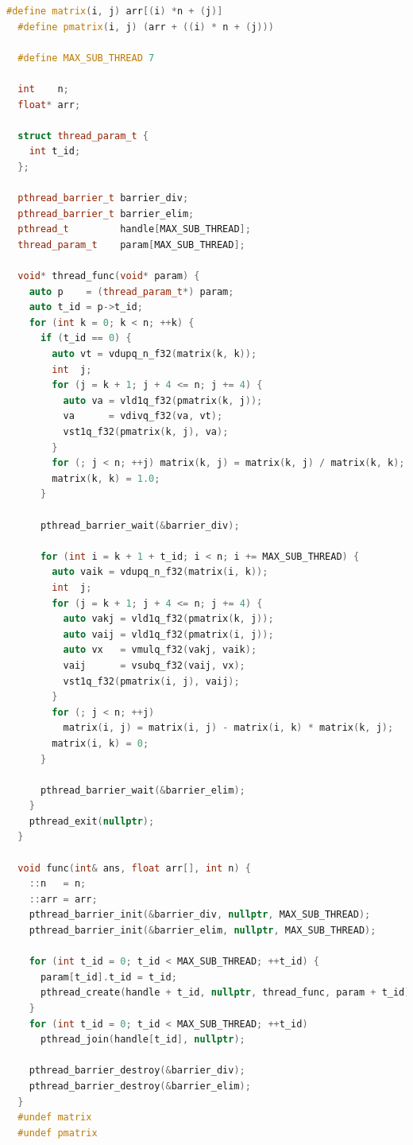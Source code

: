 \documentclass[a4paper]{article}
\begin{document}
\begin{lstlisting}[title=线程池 + 栅栏同步 + 工作线程执行除法 + NEON 指令集加速,frame=trbl,language={C++}]
  #define matrix(i, j) arr[(i) *n + (j)]
  #define pmatrix(i, j) (arr + ((i) * n + (j)))
  
  #define MAX_SUB_THREAD 7
  
  int    n;
  float* arr;
  
  struct thread_param_t {
    int t_id;
  };
  
  pthread_barrier_t barrier_div;
  pthread_barrier_t barrier_elim;
  pthread_t         handle[MAX_SUB_THREAD];
  thread_param_t    param[MAX_SUB_THREAD];
  
  void* thread_func(void* param) {
    auto p    = (thread_param_t*) param;
    auto t_id = p->t_id;
    for (int k = 0; k < n; ++k) {
      if (t_id == 0) {
        auto vt = vdupq_n_f32(matrix(k, k));
        int  j;
        for (j = k + 1; j + 4 <= n; j += 4) {
          auto va = vld1q_f32(pmatrix(k, j));
          va      = vdivq_f32(va, vt);
          vst1q_f32(pmatrix(k, j), va);
        }
        for (; j < n; ++j) matrix(k, j) = matrix(k, j) / matrix(k, k);
        matrix(k, k) = 1.0;
      }
  
      pthread_barrier_wait(&barrier_div);
  
      for (int i = k + 1 + t_id; i < n; i += MAX_SUB_THREAD) {
        auto vaik = vdupq_n_f32(matrix(i, k));
        int  j;
        for (j = k + 1; j + 4 <= n; j += 4) {
          auto vakj = vld1q_f32(pmatrix(k, j));
          auto vaij = vld1q_f32(pmatrix(i, j));
          auto vx   = vmulq_f32(vakj, vaik);
          vaij      = vsubq_f32(vaij, vx);
          vst1q_f32(pmatrix(i, j), vaij);
        }
        for (; j < n; ++j)
          matrix(i, j) = matrix(i, j) - matrix(i, k) * matrix(k, j);
        matrix(i, k) = 0;
      }
  
      pthread_barrier_wait(&barrier_elim);
    }
    pthread_exit(nullptr);
  }
  
  void func(int& ans, float arr[], int n) {
    ::n   = n;
    ::arr = arr;
    pthread_barrier_init(&barrier_div, nullptr, MAX_SUB_THREAD);
    pthread_barrier_init(&barrier_elim, nullptr, MAX_SUB_THREAD);
  
    for (int t_id = 0; t_id < MAX_SUB_THREAD; ++t_id) {
      param[t_id].t_id = t_id;
      pthread_create(handle + t_id, nullptr, thread_func, param + t_id);
    }
    for (int t_id = 0; t_id < MAX_SUB_THREAD; ++t_id)
      pthread_join(handle[t_id], nullptr);
  
    pthread_barrier_destroy(&barrier_div);
    pthread_barrier_destroy(&barrier_elim);
  }
  #undef matrix
  #undef pmatrix
\end{lstlisting}
\end{document}
